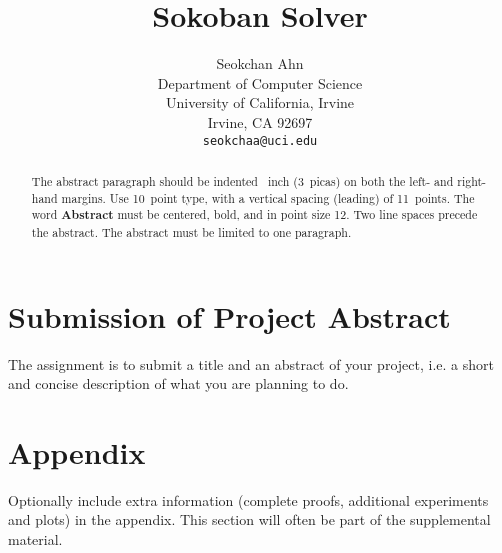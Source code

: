 \documentclass{article}
\title{Sokoban Solver}
\author{
  Seokchan Ahn\\
  Department of Computer Science\\
  University of California, Irvine\\
  Irvine, CA 92697\\
  \texttt{seokchaa@uci.edu} \\
   \And
}
\begin{document}
\maketitle

\begin{abstract}
  The abstract paragraph should be indented ~inch (3~picas) on
  both the left- and right-hand margins. Use 10~point type, with a vertical
  spacing (leading) of 11~points.  The word \textbf{Abstract} must be centered,
  bold, and in point size 12. Two line spaces precede the abstract. The abstract
  must be limited to one paragraph.
\end{abstract}

\section{Submission of Project Abstract}

The assignment is to submit a title and an abstract of your project, i.e. a short and concise description of what you are planning to do.


\appendix

\section{Appendix}

Optionally include extra information (complete proofs, additional experiments and plots) in the appendix.
This section will often be part of the supplemental material.
\end{document}
